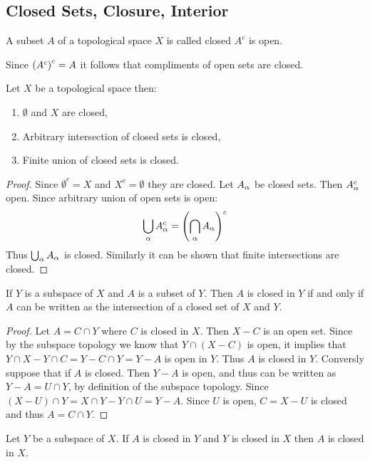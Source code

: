 \subsection{Closed Sets, Closure, Interior}
\begin{definition}
  A subset $A$ of a topological space $X$ is called closed $A^c$ is open.
\end{definition}
\begin{remark}
  Since $\left(A^c\right)^c = A$ it follows that compliments of open sets are closed.
\end{remark}
\begin{theorem}
  Let $X$ be a topological space then:
  \begin{enumerate}
    \item $\emptyset$ and $X$ are closed,
    \item Arbitrary intersection of closed sets is closed,
    \item Finite union of closed sets is closed.
  \end{enumerate}
\end{theorem}
\begin{proof}
  Since $\emptyset^c = X$ and $X^c = \emptyset$ they are closed. Let $A_\alpha$ be closed sets. Then $A_\alpha^c$ open. Since arbitrary union of open sets is open:
  \begin{align*}
    \bigcup_\alpha A_\alpha^c = \left(\bigcap_\alpha A_\alpha\right)^c
  \end{align*}
  Thus $\bigcup_\alpha A_\alpha$ is closed. Similarly it can be shown that finite intersections are closed.
\end{proof}
\begin{theorem}
  If $Y$ is a subspace of $X$ and $A$ is a subset of $Y$. Then $A$ is closed in $Y$ if and only if $A$ can be written as the intersection of a closed set of $X$ and $Y$.
\end{theorem}
\begin{proof}
  Let $A = C\cap Y$ where $C$ is closed in $X$. Then $X-C$ is an open set. Since by the subspace topology we know that $Y\cap (X-C)$ is open, it implies that $Y\cap X - Y\cap C = Y - C\cap Y = Y-A$ is open in $Y$. Thus $A$ is closed in $Y$. Conversly suppose that if $A$ is closed. Then $Y-A$ is open, and thus can be written as $Y-A = U\cap Y$, by definition of the subspace topology. Since $(X-U)\cap Y = X\cap Y - Y\cap U = Y - A$. Since $U$ is open, $C = X-U$ is closed and thus $A = C\cap Y$.
\end{proof}
\begin{theorem}
  Let $Y$ be a subspace of $X$. If $A$ is closed in $Y$ and $Y$ is closed in $X$ then $A$ is closed in $X$.
\end{theorem}
